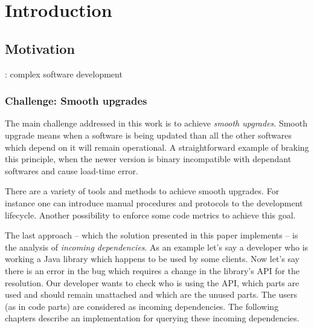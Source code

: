 \chapter{Introduction}

\section{Motivation}

: complex software development


\subsection{Challenge: Smooth upgrades}
The main challenge addressed in this work is to achieve \emph{smooth upgrades}. Smooth upgrade means
when a software is being updated than all the other softwares which depend on it
will remain operational. A straightforward example of braking this principle,
when the newer version is binary incompatible with dependant softwares and cause
load-time error.


There are a variety of tools and methods to achieve smooth upgrades. For
instance one can introduce manual procedures and protocols to the development
lifecycle. Another possibility to enforce some code metrics to achieve this
goal.


The last approach -- which the solution presented in this paper implements -- is
the analysis of \emph{incoming dependencies}. As an example let's say a
developer who is working a Java library which happens to be used by some
clients. Now let's say there is an error in the bug which requires a change in
the library's API for the resolution. Our developer wants to check who is using
the API, which parts are used and should remain unattached and which are the
unused parts. The users (as in code parts) are considered as incoming
dependencies. The following chapters describe an implementation for querying these 
incoming dependencies. 
 

